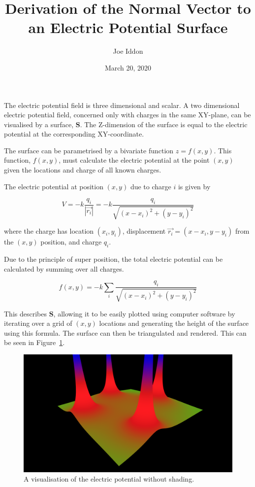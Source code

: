\documentclass{article} %
\begin{document}
\title{Derivation of the Normal Vector to an Electric Potential Surface}
\author{Joe Iddon}
\date{March 20, 2020}
\maketitle

The electric potential field is three dimensional and scalar. A two dimensional electric potential field, concerned only with charges in the same XY-plane, can be visualised by a surface, $\textbf{S}$. The Z-dimension of the surface is equal to the electric potential at the corresponding XY-coordinate.


The surface can be parametrised by a bivariate function $z = f(x,y)$. This function, $f(x,y)$, must calculate the electric potential at the point $(x,y)$ given the locations and charge of all known charges.

The electric potential at position $(x,y)$ due to charge $i$ is given by

$$V = -k\frac{q_i}{|\vec{r_i}|} = -k\frac{q_i}{\sqrt{(x-x_i)^2 + (y-y_i)^2}}$$

where the charge has location $(x_i, y_i)$, displacement $\vec{r_i} =  (x-x_i,y-y_i)$ from the $(x,y)$ position, and charge $q_i$.

Due to the principle of super position, the total electric potential can be calculated by summing over all charges.

\begin{equation}f(x,y) = -k\sum_{i}\frac{q_i}{\sqrt{(x-x_i)^2 + (y-y_i)^2}}\label{eqn:potential}\end{equation}

This describes $\textbf{S}$, allowing it to be easily plotted using computer software by iterating over a grid of $(x,y)$ locations and generating the height of the surface using this formula. The surface can then be triangulated and rendered. This can be seen in Figure~\ref{fig:no-shading}.

\begin{figure}
\includegraphics[width=\linewidth]{no_shading.png}
\caption{A visualisation of the electric potential without shading.}
\label{fig:no-shading}
\end{figure}
\end{document}
